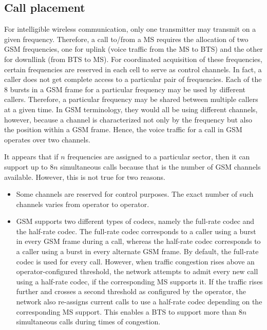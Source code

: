 \subsection{Call placement} %
For intelligible wireless communication, only one transmitter may transmit on a given frequency. Therefore, a call to/from a MS requires the allocation of two GSM frequencies, one for uplink (voice traffic from the MS to BTS) and the other for downllink (from BTS to MS). For coordinated acquisition of these frequencies, certain frequencies are reserved in each cell to serve as control channels. In fact, a caller does not get complete access to a particular pair of frequencies. Each of the 8 bursts in a GSM frame for a particular frequency may be used by different callers. Therefore, a particular frequency may be shared between multiple callers at a given time. In GSM terminology, they would all be using different channels, however, because a channel is characterized not only by the frequency but also the position within a GSM frame. Hence, the voice traffic for a call in GSM operates over two channels.

It appears that if $n$ frequencies are assigned to a particular sector, then it can support up to $8n$ simultaneous calls because that is the number of GSM channels available. However, this is not true for two reasons. 
\begin{itemize}
\item Some channels are reserved for control purposes. The exact number of such channels varies from operator to operator.
\item GSM supports two different types of codecs, namely the full-rate codec and the half-rate codec. The full-rate codec corresponds to a caller using a burst in every GSM frame during a call, whereas the half-rate codec corresponds to a caller using a burst in every alternate GSM frame. By default, the full-rate codec is used for every call. However, when traffic congestion rises above an operator-configured threshold, the network attempts to admit every new call using a half-rate codec, if the corresponding MS supports it. If the traffic rises further and crosses a second threshold as configured by the operator, the network also re-assigns current calls to use a half-rate codec depending on the corresponding MS support. This enables a BTS to support more than $8n$ simultaneous calls during times of congestion.
\end{itemize}
 

